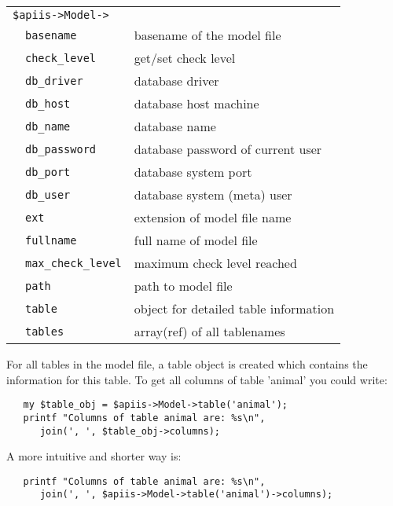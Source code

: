 \smallskip
\begin{tabular}{rl|l}
\multicolumn{3}{l}{\texttt{\$apiis->Model->}}       \\
                      &\verb+basename+         & basename of the model file \\
                      &\verb+check_level+      & get/set check level \\
                      &\verb+db_driver+        & database driver \\
                      &\verb+db_host+          & database host machine \\
                      &\verb+db_name+          & database name \\
                      &\verb+db_password+      & database password of current user \\
                      &\verb+db_port+          & database system port \\
                      &\verb+db_user+          & database system (meta) user \\
                      &\verb+ext+              & extension of model file name \\
                      &\verb+fullname+         & full name of model file \\
                      &\verb+max_check_level+  & maximum check level reached \\
                      &\verb+path+             & path to model file \\
                      &\verb+table+            & object for detailed table information \\
                      &\verb+tables+           & array(ref) of all tablenames \\
\end{tabular}
\medskip

For all tables in the model file, a table object is created which contains the
information for this table. To get all columns of table 'animal' you could write:

\begin{verbatim}
   my $table_obj = $apiis->Model->table('animal');
   printf "Columns of table animal are: %s\n",
      join(', ', $table_obj->columns);
\end{verbatim}

A more intuitive and shorter way is:

\begin{verbatim}
   printf "Columns of table animal are: %s\n",
      join(', ', $apiis->Model->table('animal')->columns);
\end{verbatim}

